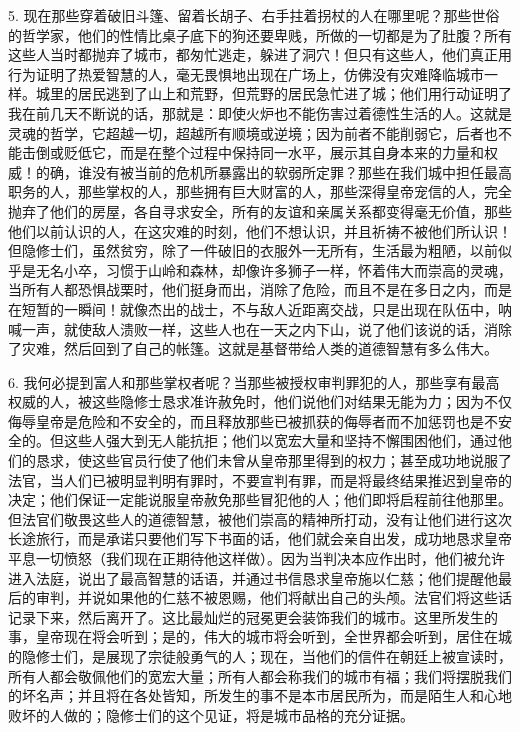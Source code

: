 5. 现在那些穿着破旧斗篷、留着长胡子、右手拄着拐杖的人在哪里呢？那些世俗的哲学家，他们的性情比桌子底下的狗还要卑贱，所做的一切都是为了肚腹？所有这些人当时都抛弃了城市，都匆忙逃走，躲进了洞穴！但只有这些人，他们真正用行为证明了热爱智慧的人，毫无畏惧地出现在广场上，仿佛没有灾难降临城市一样。城里的居民逃到了山上和荒野，但荒野的居民急忙进了城；他们用行动证明了我在前几天不断说的话，那就是：即使火炉也不能伤害过着德性生活的人。这就是灵魂的哲学，它超越一切，超越所有顺境或逆境；因为前者不能削弱它，后者也不能击倒或贬低它，而是在整个过程中保持同一水平，展示其自身本来的力量和权威！的确，谁没有被当前的危机所暴露出的软弱所定罪？那些在我们城中担任最高职务的人，那些掌权的人，那些拥有巨大财富的人，那些深得皇帝宠信的人，完全抛弃了他们的房屋，各自寻求安全，所有的友谊和亲属关系都变得毫无价值，那些他们以前认识的人，在这灾难的时刻，他们不想认识，并且祈祷不被他们所认识！但隐修士们，虽然贫穷，除了一件破旧的衣服外一无所有，生活最为粗陋，以前似乎是无名小卒，习惯于山岭和森林，却像许多狮子一样，怀着伟大而崇高的灵魂，当所有人都恐惧战栗时，他们挺身而出，消除了危险，而且不是在多日之内，而是在短暂的一瞬间！就像杰出的战士，不与敌人近距离交战，只是出现在队伍中，呐喊一声，就使敌人溃败一样，这些人也在一天之内下山，说了他们该说的话，消除了灾难，然后回到了自己的帐篷。这就是基督带给人类的道德智慧有多么伟大。\par

6. 我何必提到富人和那些掌权者呢？当那些被授权审判罪犯的人，那些享有最高权威的人，被这些隐修士恳求准许赦免时，他们说他们对结果无能为力；因为不仅侮辱皇帝是危险和不安全的，而且释放那些已被抓获的侮辱者而不加惩罚也是不安全的。但这些人强大到无人能抗拒；他们以宽宏大量和坚持不懈围困他们，通过他们的恳求，使这些官员行使了他们未曾从皇帝那里得到的权力；甚至成功地说服了法官，当人们已被明显判明有罪时，不要宣判有罪，而是将最终结果推迟到皇帝的决定；他们保证一定能说服皇帝赦免那些冒犯他的人；他们即将启程前往他那里。但法官们敬畏这些人的道德智慧，被他们崇高的精神所打动，没有让他们进行这次长途旅行，而是承诺只要他们写下书面的话，他们就会亲自出发，成功地恳求皇帝平息一切愤怒（我们现在正期待他这样做）。因为当判决本应作出时，他们被允许进入法庭，说出了最高智慧的话语，并通过书信恳求皇帝施以仁慈；他们提醒他最后的审判，并说如果他的仁慈不被恩赐，他们将献出自己的头颅。法官们将这些话记录下来，然后离开了。这比最灿烂的冠冕更会装饰我们的城市。这里所发生的事，皇帝现在将会听到；是的，伟大的城市将会听到，全世界都会听到，居住在城的隐修士们，是展现了宗徒般勇气的人；现在，当他们的信件在朝廷上被宣读时，所有人都会敬佩他们的宽宏大量；所有人都会称我们的城市有福；我们将摆脱我们的坏名声；并且将在各处皆知，所发生的事不是本市居民所为，而是陌生人和心地败坏的人做的；隐修士们的这个见证，将是城市品格的充分证据。\par

